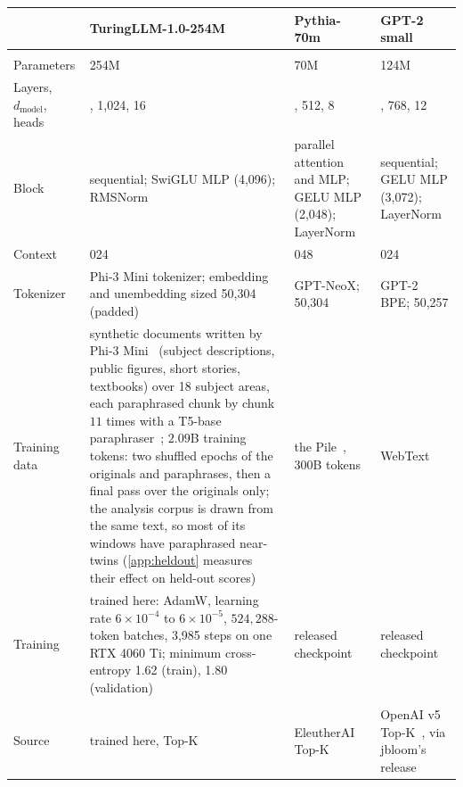 \documentclass[10pt]{article}
\begin{document}
\begin{table}[!ht]
\centering
\footnotesize
\setlength{\tabcolsep}{4pt}
\begin{tabularx}{\linewidth}{@{}>{\raggedright\arraybackslash}p{2.0cm}>{\raggedright\arraybackslash}X>{\raggedright\arraybackslash}X>{\raggedright\arraybackslash}X@{}}
\toprule
 & \textbf{TuringLLM-1.0-254M} & \textbf{Pythia-70m}~\citep{biderman2023pythia} & \textbf{GPT-2 small}~\citep{radford2019language} \\
\midrule
\multicolumn{4}{@{}l}{\emph{Model}} \\
Parameters & 254M & 70M & 124M \\
Layers, $d_{\mathrm{model}}$, heads & 12, 1{,}024, 16 & 6, 512, 8 & 12, 768, 12 \\
Block & sequential; SwiGLU MLP (4{,}096); RMSNorm & parallel attention and MLP; GELU MLP (2{,}048); LayerNorm & sequential; GELU MLP (3{,}072); LayerNorm \\
Context & 1{,}024 & 2{,}048 & 1{,}024 \\
Tokenizer & Phi-3 Mini tokenizer; embedding and unembedding sized 50{,}304 (padded) & GPT-NeoX; 50{,}304 & GPT-2 BPE; 50{,}257 \\
Training data & synthetic documents written by Phi-3 Mini~\citep{abdin2024phi3} (subject descriptions, public figures, short stories, textbooks) over 18 subject areas, each paraphrased chunk by chunk $11$ times with a T5-base paraphraser~\citep{vorobev2023paraphraser}; $2.09$B training tokens: two shuffled epochs of the originals and paraphrases, then a final pass over the originals only; the analysis corpus is drawn from the same text, so most of its windows have paraphrased near-twins (\cref{app:heldout} measures their effect on held-out scores) & the Pile~\citep{gao2020pile}, 300B tokens & WebText \\
Training & trained here: AdamW, learning rate $6\times10^{-4}$ to $6\times10^{-5}$, $524{,}288$-token batches, 3{,}985 steps on one RTX 4060 Ti; minimum cross-entropy 1.62 (train), 1.80 (validation) & released checkpoint & released checkpoint \\
\midrule
\multicolumn{4}{@{}l}{\emph{Dictionaries}} \\
Source & trained here, Top-K & EleutherAI Top-K & OpenAI v5 Top-K~\citep{gao2024scaling}, via jbloom's release \\

\end{tabularx}
\end{table}
\end{document}
